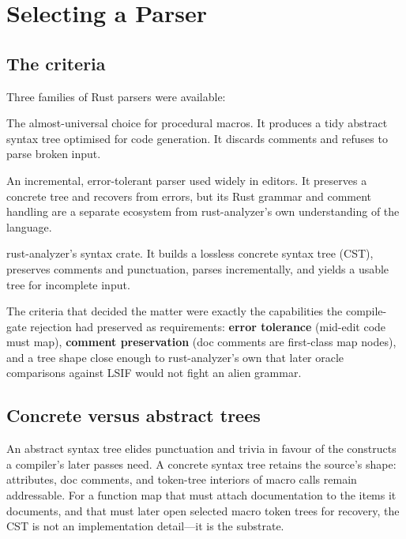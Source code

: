 \documentclass[11pt,a4paper,oneside]{report}
\begin{document}
\chapter{Selecting a Parser}
\label{ch:parser}

\section{The criteria}

Three families of Rust parsers were available:

\begin{description}[style=nextline,leftmargin=1em]
  \item[\texttt{syn}] The almost-universal choice for procedural macros.
    It produces a tidy abstract syntax tree optimised for code generation.
    It discards comments and refuses to parse broken input.
  \item[\texttt{tree-sitter-rust}] An incremental, error-tolerant parser
    used widely in editors. It preserves a concrete tree and recovers from
    errors, but its Rust grammar and comment handling are a separate
    ecosystem from rust-analyzer's own understanding of the language.
  \item[\texttt{ra\_ap\_syntax}] rust-analyzer's syntax crate. It builds a
    lossless concrete syntax tree (CST), preserves comments and punctuation,
    parses incrementally, and yields a usable tree for incomplete input.
\end{description}

The criteria that decided the matter were exactly the capabilities the
compile-gate rejection had preserved as requirements: \textbf{error
tolerance} (mid-edit code must map), \textbf{comment preservation} (doc
comments are first-class map nodes), and a tree shape close enough to
rust-analyzer's own that later oracle comparisons against LSIF would not
fight an alien grammar.

\section{Concrete versus abstract trees}

An abstract syntax tree elides punctuation and trivia in favour of the
constructs a compiler's later passes need. A concrete syntax tree retains the
source's shape: attributes, doc comments, and token-tree interiors of macro
calls remain addressable. For a function map that must attach documentation
to the items it documents, and that must later open selected macro token
trees for recovery, the CST is not an implementation detail---it is the
substrate.
\end{document}

